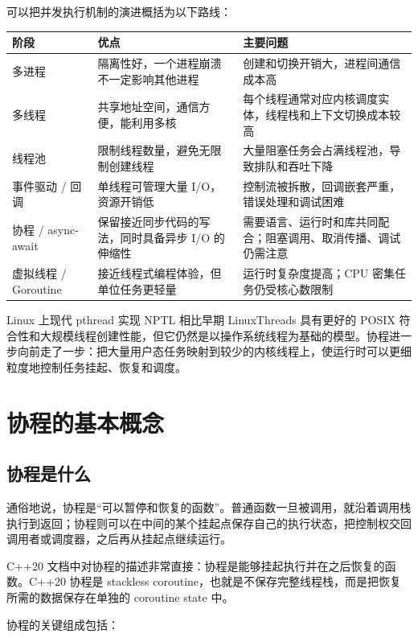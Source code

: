 \documentclass[UTF8,zihao=-4]{ctexart}
\begin{document}
可以把并发执行机制的演进概括为以下路线：

\begin{center}
\begin{tabular}{p{3cm}p{5.2cm}p{5.8cm}}
\toprule
阶段 & 优点 & 主要问题 \\
\midrule
多进程 & 隔离性好，一个进程崩溃不一定影响其他进程 & 创建和切换开销大，进程间通信成本高 \\
多线程 & 共享地址空间，通信方便，能利用多核 & 每个线程通常对应内核调度实体，线程栈和上下文切换成本较高 \\
线程池 & 限制线程数量，避免无限制创建线程 & 大量阻塞任务会占满线程池，导致排队和吞吐下降 \\
事件驱动 / 回调 & 单线程可管理大量 I/O，资源开销低 & 控制流被拆散，回调嵌套严重，错误处理和调试困难 \\
协程 / async-await & 保留接近同步代码的写法，同时具备异步 I/O 的伸缩性 & 需要语言、运行时和库共同配合；阻塞调用、取消传播、调试仍需注意 \\
虚拟线程 / Goroutine & 接近线程式编程体验，但单位任务更轻量 & 运行时复杂度提高；CPU 密集任务仍受核心数限制 \\
\bottomrule
\end{tabular}
\end{center}

Linux 上现代 pthread 实现 NPTL 相比早期 LinuxThreads 具有更好的 POSIX 符合性和大规模线程创建性能，但它仍然是以操作系统线程为基础的模型\cite{pthreads}。协程进一步向前走了一步：把大量用户态任务映射到较少的内核线程上，使运行时可以更细粒度地控制任务挂起、恢复和调度。

\section{协程的基本概念}

\subsection{协程是什么}

通俗地说，协程是“可以暂停和恢复的函数”。普通函数一旦被调用，就沿着调用栈执行到返回；协程则可以在中间的某个挂起点保存自己的执行状态，把控制权交回调用者或调度器，之后再从挂起点继续运行。

C++20 文档中对协程的描述非常直接：协程是能够挂起执行并在之后恢复的函数。C++20 协程是 stackless coroutine，也就是不保存完整线程栈，而是把恢复所需的数据保存在单独的 coroutine state 中\cite{cppref}。

协程的关键组成包括：
\end{document}
